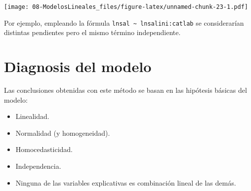 \documentclass[]{book}
\newenvironment{Shaded}{\begin{snugshade}}{\end{snugshade}}
\newcommand{\KeywordTok}[1]{\textcolor[rgb]{0.13,0.29,0.53}{\textbf{#1}}}
\newcommand{\DataTypeTok}[1]{\textcolor[rgb]{0.13,0.29,0.53}{#1}}
\newcommand{\DecValTok}[1]{\textcolor[rgb]{0.00,0.00,0.81}{#1}}
\newcommand{\StringTok}[1]{\textcolor[rgb]{0.31,0.60,0.02}{#1}}
\newcommand{\OperatorTok}[1]{\textcolor[rgb]{0.81,0.36,0.00}{\textbf{#1}}}
\newcommand{\NormalTok}[1]{#1}
\begin{document}
\begin{Shaded}
\end{Shaded}

\texttt{[image: 08-ModelosLineales\_files/figure-latex/unnamed-chunk-23-1.pdf]}

Por ejemplo, empleando la fórmula
\texttt{lnsal\ \textasciitilde{}\ lnsalini:catlab} se considerarían
distintas pendientes pero el mismo término independiente.

\section{Diagnosis del modelo}\label{diagnosis-del-modelo}

Las conclusiones obtenidas con este método se basan en las hipótesis
básicas del modelo:

\begin{itemize}
\item
  Linealidad.
\item
  Normalidad (y homogeneidad).
\item
  Homocedasticidad.
\item
  Independencia.
\item
  Ninguna de las variables explicativas es combinación lineal de las
  demás.
\end{itemize}
\end{document}
